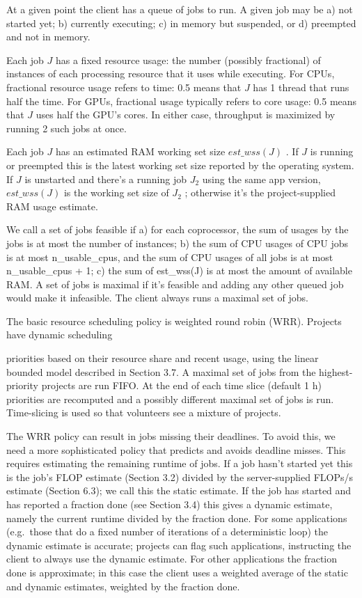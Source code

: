 \documentclass[
]{article}
\begin{document}
At a given point the client has a queue of jobs to run. A given job may
be a) not started yet; b) currently executing; c) in memory but
suspended, or d) preempted and not in memory.

Each job \(J\) has a fixed resource usage: the number (possibly
fractional) of instances of each processing resource that it uses while
executing. For CPUs, fractional resource usage refers to time: 0.5 means
that \(J\) has 1 thread that runs half the time. For GPUs, fractional
usage typically refers to core usage: 0.5 means that \(J\) uses half the
GPU's cores. In either case, throughput is maximized by running 2 such
jobs at once.

Each job \(J\) has an estimated RAM working set size \(est\_wss(J)\) .
If \(J\) is running or preempted this is the latest working set size
reported by the operating system. If \(J\) is unstarted and there's a
running job \(J_2\) using the same app version, \(est\_wss(J)\) is the
working set size of \(J_2\) ; otherwise it's the project-supplied RAM
usage estimate.

We call a set of jobs feasible if a) for each coprocessor, the sum of
usages by the jobs is at most the number of instances; b) the sum of CPU
usages of CPU jobs is at most n\_usable\_cpus, and the sum of CPU usages
of all jobs is at most n\_usable\_cpus + 1; c) the sum of est\_wss(J) is
at most the amount of available RAM. A set of jobs is maximal if it's
feasible and adding any other queued job would make it infeasible. The
client always runs a maximal set of jobs.

The basic resource scheduling policy is weighted round robin (WRR).
Projects have dynamic scheduling

priorities based on their resource share and recent usage, using the
linear bounded model described in Section 3.7. A maximal set of jobs
from the highest-priority projects are run FIFO. At the end of each time
slice (default 1 h) priorities are recomputed and a possibly different
maximal set of jobs is run. Time-slicing is used so that volunteers see
a mixture of projects.

The WRR policy can result in jobs missing their deadlines. To avoid
this, we need a more sophisticated policy that predicts and avoids
deadline misses. This requires estimating the remaining runtime of jobs.
If a job hasn't started yet this is the job's FLOP estimate (Section
3.2) divided by the server-supplied FLOPs/s estimate (Section 6.3); we
call this the static estimate. If the job has started and has reported a
fraction done (see Section 3.4) this gives a dynamic estimate, namely
the current runtime divided by the fraction done. For some applications
(e.g.~those that do a fixed number of iterations of a deterministic
loop) the dynamic estimate is accurate; projects can flag such
applications, instructing the client to always use the dynamic estimate.
For other applications the fraction done is approximate; in this case
the client uses a weighted average of the static and dynamic estimates,
weighted by the fraction done.
\end{document}
